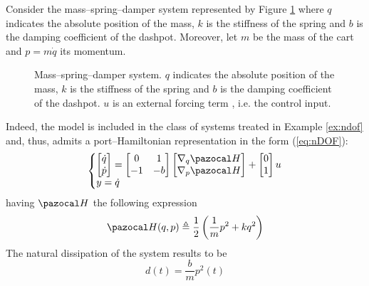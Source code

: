 \begin{exmp}\label{ex:msd}
    Consider the mass--spring--damper system represented by Figure \ref{fig:msd} where $q$ indicates the absolute position of the mass, $k$ is the stiffness of the spring and $b$ is the damping coefficient of the dashpot. Moreover, let $m$ be the mass of the cart and $p = m\dot{q}$ its momentum. 
    \begin{figure}[!t]
	    \centering
	    
        \caption[Mass--spring--damper system.]{Mass--spring--damper system. $q$ indicates the absolute position of the mass, $k$ is the stiffness of the spring and $b$ is the damping coefficient of the dashpot. $u$ is an external forcing term , i.e. the control input.}
        \label{fig:msd}
    \end{figure}
    Indeed, the model is included in the class of systems treated in Example \ref{ex:ndof} and, thus, admits a port--Hamiltonian representation in the form (\ref{eq:nDOF}):
    \begin{equation}\label{eq:msd}
	    \left\{
	        \begin{matrix*}[l]
	        \begin{bmatrix}	\dot{q}\\\dot{p}\end{bmatrix} 
        	=
	        \begin{bmatrix}0&1\\-1&-b\end{bmatrix}
	        \begin{bmatrix}{\nabla}_{q}\Ha\\{\nabla}_{p}\Ha\end{bmatrix}
	        +
	        \begin{bmatrix}0\\1\end{bmatrix}u\\
	        y = \dot{q}
	    \end{matrix*}
	    \right.
    \end{equation}
    having $\Ha$ the following expression
    \begin{equation}
        \Ha(q,p) \triangleq \frac{1}{2}\left(\frac{1}{m}p^2 + kq^2\right)
    \end{equation}
    The natural dissipation of the system results to be
    \begin{equation}
        d(t) = \frac{b}{m}p^2(t)
    \end{equation}

\end{exmp}
